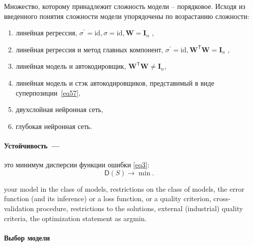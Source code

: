 \documentclass[12pt, twoside]{article}
\newenvironment{comment}{}{}
\newcommand{\w}{{\mathbf{W}}}
\begin{document}
\begin{comment}
Множество, которому принадлежит сложность модели – порядковое. Исходя из введенного понятия сложности модели упорядочены 
по возрастанию сложности:
\begin{enumerate}
\item[1)] линейная регрессия,  $\sigma^{'} = \text{id}, \sigma = \text{id}, \w = \mathbf{I}_n $ ,
\item[2)] линейная регрессия и метод главных компонент, $\sigma^{'} = \text{id}, \w^\mathsf{T}\w = \mathbf{I}_n $ ,
\item[3)] линейная модель и автокодировщик, $\w^\mathsf{T}\w \neq \textbf{I}_n$,
\item[4)] линейная модель и стэк автокодировщиков, представимый в виде суперпозиции~\eqref{eq57},
\item[5)] двухслойная нейронная сеть,
\item[6)] глубокая нейронная сеть.
\end{enumerate}

\paragraph{Устойчивость~---}это минимум дисперсии функции ошибки \eqref{eq3}:
\begin{equation}\label{eq103}
\mathsf{D}(S) \rightarrow \min.
\end{equation}

your model in the class of models,
restrictions on the class of models,
the error function (and its inference) or a loss function, or a quality criterion,
cross-validation procedure,
restrictions to the solutions,
external (industrial) quality criteria,
the optimization statement as argmin.





















\paragraph{Выбор модели}


\end{comment}
\end{document}

